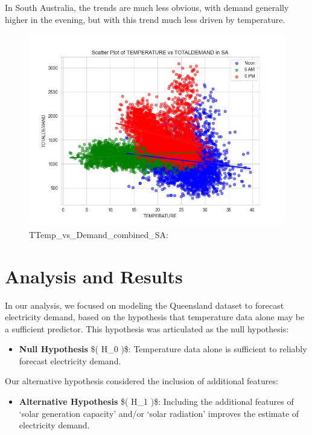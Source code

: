 \documentclass[mstat,12pt]{unswthesis}
\providecommand{\tightlist}{%
  \setlength{\itemsep}{0pt}\setlength{\parskip}{0pt}}
\begin{document}
In South Australia, the trends are much less obvious, with demand
generally higher in the evening, but with this trend much less driven by
temperature.

\begin{figure}
\centering
\includegraphics{img/Temp_vs_Demand_combined_SA.jpg}
\caption{TTemp\_vs\_Demand\_combined\_SA:}
\end{figure}

\section{Analysis and Results}\label{analysis-and-results}

In our analysis, we focused on modeling the Queensland dataset to
forecast electricity demand, based on the hypothesis that temperature
data alone may be a sufficient predictor. This hypothesis was
articulated as the null hypothesis:

\begin{itemize}
\tightlist
\item
  \textbf{Null Hypothesis} \$( H\_0 )\$: Temperature data alone is
  sufficient to reliably forecast electricity demand.
\end{itemize}

Our alternative hypothesis considered the inclusion of additional
features:

\begin{itemize}
\tightlist
\item
  \textbf{Alternative Hypothesis} \$( H\_1 )\$: Including the additional
  features of `solar generation capacity' and/or `solar radiation'
  improves the estimate of electricity demand.
\end{itemize}
\end{document}
